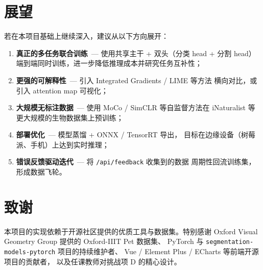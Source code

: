 \documentclass[12pt, a4paper, openany]{ctexbook}
\begin{document}
\section{展望}

若在本项目基础上继续深入，建议从以下方向展开：

\begin{enumerate}[leftmargin=*]
  \item \textbf{真正的多任务联合训练}\ — 使用共享主干 + 双头（分类 head + 分割 head）
        端到端同时训练，进一步降低推理成本并研究任务互补性；
  \item \textbf{更强的可解释性}\ — 引入 Integrated Gradients / LIME 等方法
        横向对比，或引入 attention map 可视化；
  \item \textbf{大规模无标注数据}\ — 使用 MoCo / SimCLR 等自监督方法在
        iNaturalist 等更大规模的生物数据集上预训练；
  \item \textbf{部署优化}\ — 模型蒸馏 + ONNX / TensorRT 导出，
        目标在边缘设备（树莓派、手机）上达到实时推理；
  \item \textbf{错误反馈驱动迭代}\ — 将 \texttt{/api/feedback} 收集到的数据
        周期性回流训练集，形成数据飞轮。
\end{enumerate}

\section{致谢}

本项目的实现依赖于开源社区提供的优质工具与数据集。特别感谢
Oxford Visual Geometry Group 提供的 Oxford-IIIT Pet 数据集、
PyTorch 与 \texttt{segmentation-models-pytorch} 项目的持续维护者、
Vue / Element Plus / ECharts 等前端开源项目的贡献者，
以及任课教师对挑战项 D 的精心设计。
\end{document}
